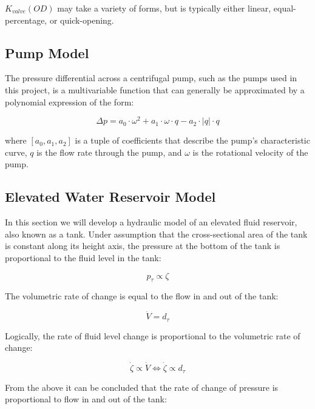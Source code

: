 $K_{valve}(OD)$ may take a variety of forms, but is typically either linear, equal-percentage, or quick-opening.

\subsection{Pump Model}\label{subsec:PumpModel}

The pressure differential across a centrifugal pump, such as the pumps used in this project, is a multivariable function that can generally be approximated by a polynomial expression of the form:

\begin{equation}\label{eq:PumpPressure}
	\Delta p =   a_0\cdot \omega^2 +  a_1\cdot \omega \cdot q -a_2\cdot |q|\cdot q
\end{equation}

where $[a_0,a_1,a_2]$ is a tuple of coefficients that describe the pump's characteristic curve, $q$ is the flow rate through the pump, and $\omega$ is the rotational velocity of the pump.

\subsection{Elevated Water Reservoir Model}

In this section we will develop a hydraulic model of an elevated fluid reservoir, also known as a tank.
Under assumption that the cross-sectional area of the tank is constant along its height axis, the pressure at the bottom of the tank is proportional to the fluid level in the tank:

\begin{equation} \label{eq:p prop zeta}
	p_\tau \propto \zeta
\end{equation}

The volumetric rate of change is equal to the flow in and out of the tank:

\begin{equation} \label{eq:vdot = dt}
	\dot{V} = d_\tau
\end{equation}

Logically, the rate of fluid level change is proportional to the volumetric rate of change:  
 
 \begin{equation} \label{eq:zeta prop dt}
	\dot{\zeta} \propto \dot{V} \Leftrightarrow \dot{\zeta} \propto d_\tau
\end{equation} 

From the above it can be concluded that the rate of change of pressure is proportional to flow in and out of the tank:

